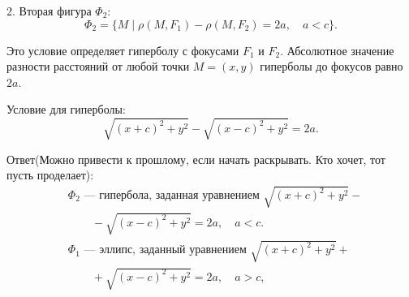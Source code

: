\documentclass[a4paper,14pt]{extreport} %
\begin{document}
2. Вторая фигура \( \Phi_2 \):
   \[
   \Phi_2 = \{ M \mid \rho(M, F_1) - \rho(M, F_2) = 2a, \quad a < c \}.
   \]

   Это условие определяет гиперболу с фокусами \( F_1 \) и \( F_2 \). Абсолютное значение разности расстояний от любой точки \( M = (x, y) \) гиперболы до фокусов равно \( 2a \).

   Условие для гиперболы:
   \[
   \sqrt{(x + c)^2 + y^2} - \sqrt{(x - c)^2 + y^2} = 2a.
   \]

 Ответ(Можно привести к прошлому, если начать раскрывать. Кто хочет, тот пусть проделает):
\[
\begin{aligned}
    &\Phi_2 \text{ — гипербола, заданная уравнением } \sqrt{(x + c)^2 + y^2} - \\
    &\hspace{25pt} - \sqrt{(x - c)^2 + y^2} = 2a, \quad a < c.\\
    &\Phi_1 \text{ — эллипс, заданный уравнением } \sqrt{(x + c)^2 + y^2} + \\
    &\hspace{25pt} + \sqrt{(x - c)^2 + y^2} = 2a, \quad a > c, \\
\end{aligned}
\]
\end{document}
